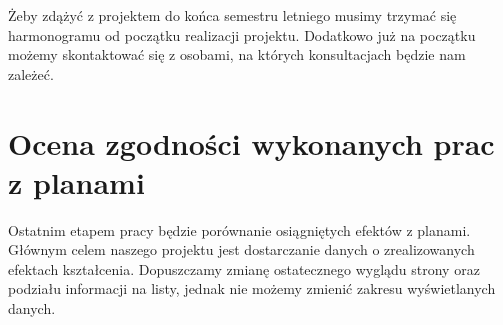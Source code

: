 \documentclass{article}
\begin{document}
Żeby zdążyć z projektem do końca semestru letniego musimy trzymać się harmonogramu od początku realizacji projektu. 
Dodatkowo już na początku możemy skontaktować się z osobami, na których konsultacjach będzie nam zależeć.


\section{Ocena zgodności wykonanych prac z planami}
Ostatnim etapem pracy będzie porównanie osiągniętych efektów z planami.
Głównym celem naszego projektu jest dostarczanie danych o zrealizowanych efektach kształcenia.
Dopuszczamy zmianę ostatecznego wyglądu strony oraz podziału informacji na listy, jednak nie możemy zmienić zakresu wyświetlanych danych.
\end{document}
